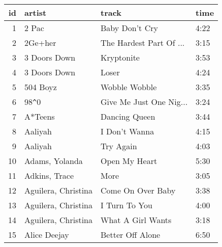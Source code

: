 \begin{tabular}{rlll}
  \toprule
 id & artist & track & time \\ 
  \midrule
    1 & 2 Pac & Baby Don't Cry & 4:22 \\ 
    2 & 2Ge+her & The Hardest Part Of ... & 3:15 \\ 
    3 & 3 Doors Down & Kryptonite & 3:53 \\ 
    4 & 3 Doors Down & Loser & 4:24 \\ 
    5 & 504 Boyz & Wobble Wobble & 3:35 \\ 
    6 & 98\verb|^|0 & Give Me Just One Nig... & 3:24 \\ 
    7 & A*Teens & Dancing Queen & 3:44 \\ 
    8 & Aaliyah & I Don't Wanna & 4:15 \\ 
    9 & Aaliyah & Try Again & 4:03 \\ 
   10 & Adams, Yolanda & Open My Heart & 5:30 \\ 
   11 & Adkins, Trace & More & 3:05 \\ 
   12 & Aguilera, Christina & Come On Over Baby & 3:38 \\ 
   13 & Aguilera, Christina & I Turn To You & 4:00 \\ 
   14 & Aguilera, Christina & What A Girl Wants & 3:18 \\ 
   15 & Alice Deejay & Better Off Alone & 6:50 \\ 
   \bottomrule
\end{tabular}
